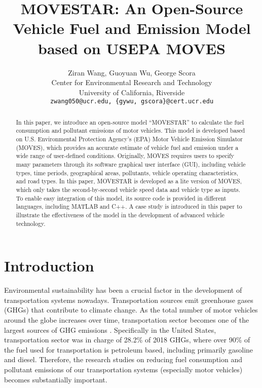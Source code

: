 \documentclass{article}
\title{MOVESTAR: An Open-Source Vehicle Fuel and Emission Model based on USEPA MOVES}
\author{
  Ziran Wang, Guoyuan Wu, George Scora\\
  Center for Environmental Research and Technology\\
  University of California, Riverside\\
  \texttt{zwang050@ucr.edu, \{gywu, gscora\}@cert.ucr.edu} \\
}
\begin{document}
\maketitle


\begin{abstract}
    In this paper, we introduce an open-source model ``MOVESTAR'' to calculate the fuel consumption and pollutant emissions of motor vehicles. This model is developed based on U.S. Environmental Protection Agency's (EPA) Motor Vehicle Emission Simulator (MOVES), which provides an accurate estimate of vehicle fuel and emission under a wide range of user-defined conditions. Originally, MOVES requires users to specify many parameters through its software graphical user interface (GUI), including vehicle types, time periods, geographical areas, pollutants, vehicle operating characteristics, and road types. In this paper, MOVESTAR is developed as a lite version of MOVES, which only takes the second-by-second vehicle speed data and vehicle type as inputs. To enable easy integration of this model, its source code is provided in different languages, including MATLAB and C++. A case study is introduced in this paper to illustrate the effectiveness of the model in the development of advanced vehicle technology.
\end{abstract}



\section{Introduction}
	
    Environmental sustainability has been a crucial factor in the development of transportation systems nowadays. Transportation sources emit greenhouse gases (GHGs) that contribute to climate change. As the total number of motor vehicles around the globe increases over time, transportation sector becomes one of the largest sources of GHG emissions \citep{usepa}. Specifically in the United States, transportation sector was in charge of 28.2\% of 2018 GHGs, where over 90\% of the fuel used for transportation is petroleum based, including primarily gasoline and diesel. Therefore, the research studies on reducing fuel consumption and pollutant emissions of our transportation systems (especially motor vehicles) becomes substantially important.
    
\end{document}
